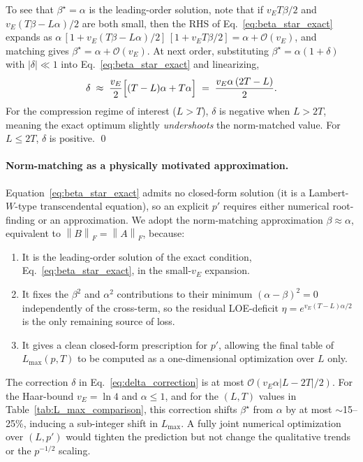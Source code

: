 \documentclass[%
 reprint,
superscriptaddress,
 amsmath,amssymb,
 aps,
]{revtex4-2}
\newcommand{\norm}[1]{\left\lVert#1\right\rVert}
\begin{document}
To see that $\beta^\star = \alpha$ is the leading-order solution, note that if $v_E T\beta/2$ and $v_E(T\beta - L\alpha)/2$ are both small, then the RHS of Eq.~\eqref{eq:beta_star_exact} expands as $\alpha\,[1 + v_E(T\beta - L\alpha)/2]\,[1 + v_E T\beta/2] = \alpha + \mathcal{O}(v_E)$, and matching gives $\beta^\star = \alpha + \mathcal{O}(v_E)$. At next order, substituting $\beta^\star = \alpha(1+\delta)$ with $|\delta|\ll 1$ into Eq.~\eqref{eq:beta_star_exact} and linearizing,
\begin{equation}
    \delta \;\approx\; \frac{v_E}{2}\Bigl[(T - L)\alpha + T\alpha\Bigr] \;=\; \frac{v_E\alpha\,(2T - L)}{2}.
    \label{eq:delta_correction}
\end{equation}
For the compression regime of interest ($L > T$), $\delta$ is negative when $L > 2T$, meaning the exact optimum slightly \emph{undershoots} the norm-matched value. For $L \le 2T$, $\delta$ is positive. \qed

\paragraph*{Norm-matching as a physically motivated approximation.}
Equation~\eqref{eq:beta_star_exact} admits no closed-form solution (it is a Lambert-$W$-type transcendental equation), so an explicit $p'$ requires either numerical root-finding or an approximation. We adopt the norm-matching approximation $\beta \approx \alpha$, equivalent to $\norm{B}_F = \norm{A}_F$, because:
\begin{enumerate}
    \item It is the leading-order solution of the exact condition, Eq.~\eqref{eq:beta_star_exact}, in the small-$v_E$ expansion.
    \item It fixes the $\beta^2$ and $\alpha^2$ contributions to their minimum $(\alpha-\beta)^2=0$ independently of the cross-term, so the residual LOE-deficit $\eta = e^{v_E(T-L)\alpha/2}$ is the only remaining source of loss.
    \item It gives a clean closed-form prescription for $p'$, allowing the final table of $L_{\max}(p,T)$ to be computed as a one-dimensional optimization over $L$ only.
\end{enumerate}
The correction $\delta$ in Eq.~\eqref{eq:delta_correction} is at most $\mathcal{O}(v_E\alpha|L-2T|/2)$. For the Haar-bound $v_E = \ln 4$ and $\alpha\le 1$, and for the $(L,T)$ values in Table~\ref{tab:L_max_comparison}, this correction shifts $\beta^\star$ from $\alpha$ by at most $\sim$15--25\%, inducing a sub-integer shift in $L_{\max}$. A fully joint numerical optimization over $(L,p')$ would tighten the prediction but not change the qualitative trends or the $p^{-1/2}$ scaling.
\end{document}
